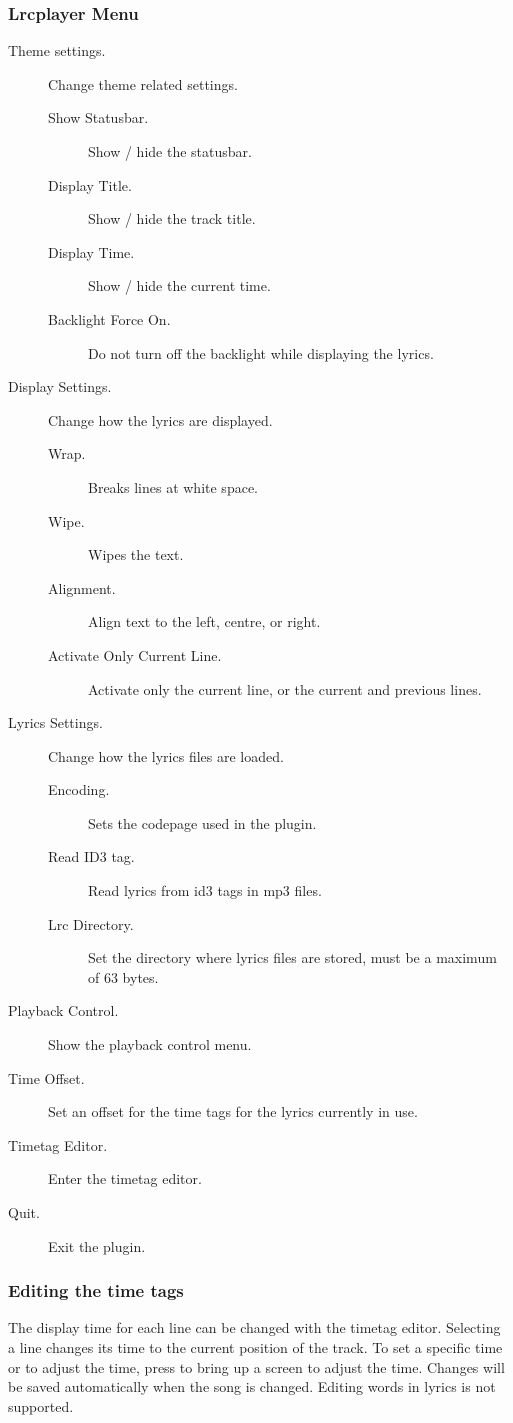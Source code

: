 \subsubsection{Lrcplayer Menu}

\begin{description}
  \item[Theme settings.] Change theme related settings.
  \begin{description}
    \item[Show Statusbar.] Show / hide the statusbar.
    \item[Display Title.] Show / hide the track title.
    \item[Display Time.] Show / hide the current time.
    \item[Backlight Force On.] Do not turn off the backlight while displaying
         the lyrics.
  \end{description}
  \item[Display Settings.] Change how the lyrics are displayed.
  \begin{description}
    \item[Wrap.] Breaks lines at white space.
    \item[Wipe.] Wipes the text.
    \item[Alignment.] Align text to the left, centre, or right.
    \item[Activate Only Current Line.]
        Activate only the current line, or the current and previous lines.
  \end{description}
  \item[Lyrics Settings.] Change how the lyrics files are loaded.
  \begin{description}
    \item[Encoding.] Sets the codepage used in the plugin.
    \item[Read ID3 tag.] Read lyrics from id3 tags in mp3 files.
    \item[Lrc Directory.] Set the directory where lyrics files are stored,
      must be a maximum of 63 bytes.
  \end{description}
  \item[Playback Control.] Show the playback control menu.
  \item[Time Offset.] Set an offset for the time tags for the lyrics currently in use.
  \item[Timetag Editor.] Enter the timetag editor.
  \item[Quit.] Exit the plugin.
\end{description}

\subsubsection{Editing the time tags}

The display time for each line can be changed with the timetag editor.
Selecting a line changes its time to the current position of the track.
To set a specific time or to adjust the time, press \ActionStdContext{} to
bring up a screen to adjust the time.
Changes will be saved automatically when the song is changed.
Editing words in lyrics is not supported.
